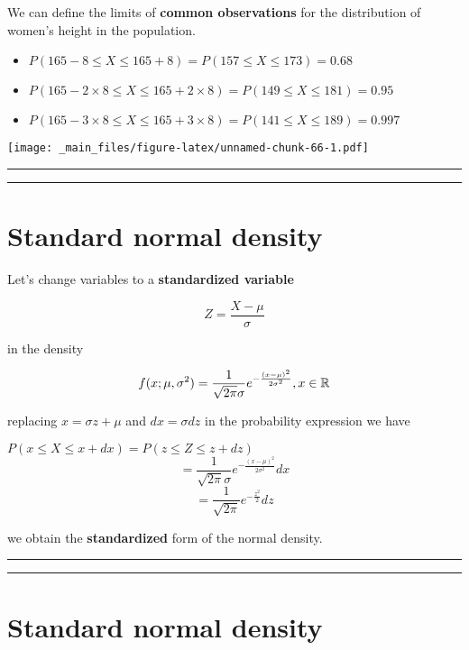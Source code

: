 \documentclass[
]{book}
\providecommand{\tightlist}{%
  \setlength{\itemsep}{0pt}\setlength{\parskip}{0pt}}
\begin{document}
We can define the limits of \textbf{common observations} for the distribution of women's height in the population.

\begin{itemize}
\tightlist
\item
  \(P(165-8 \leq X \leq 165+8)=P(157 \leq X \leq 173)=0.68\)
\item
  \(P(165-2 \times 8 \leq X \leq 165+2\times 8)=P(149 \leq X \leq 181)=0.95\)
\item
  \(P(165-3 \times 8 \leq X \leq 165+3\times 8)=P(141 \leq X \leq 189)=0.997\)
\end{itemize}

\texttt{[image: \_main\_files/figure-latex/unnamed-chunk-66-1.pdf]}

\begin{center}\rule{0.5\linewidth}{0.5pt}\end{center}

\begin{center}\rule{0.5\linewidth}{0.5pt}\end{center}

\hypertarget{standard-normal-density}{%
\section{Standard normal density}\label{standard-normal-density}}

Let's change variables to a \textbf{standardized variable}

\[Z=\frac{X-\mu}{\sigma}\]

in the density

\[f(x; \mu, \sigma^2)=\frac{1}{\sqrt{2\pi}\sigma}e^{-\frac{(x-\mu)^2}{2\sigma^2}}, x \in {\Bbb R}\]

replacing \(x=\sigma z+\mu\) and \(dx=\sigma dz\) in the probability expression we have

\(P(x\leq X \leq x +dx)=P(z\leq Z \leq z +dz)\)
\[=\frac{1}{\sqrt{2\pi}\sigma}e^{-\frac{(x-\mu)^2}{2\sigma^2}}dx\] \[=\frac{1}{ \sqrt{2\pi}}e^{-\frac{z^2}{2}} dz\]

we obtain the \textbf{standardized} form of the normal density.

\begin{center}\rule{0.5\linewidth}{0.5pt}\end{center}

\begin{center}\rule{0.5\linewidth}{0.5pt}\end{center}

\hypertarget{standard-normal-density-1}{%
\section{Standard normal density}\label{standard-normal-density-1}}
\end{document}
